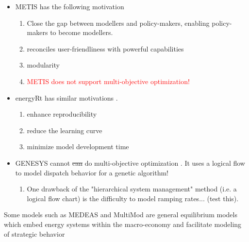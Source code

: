 \begin{itemize}
    \item METIS has the following motivation \cite{sakellaris_metis_2018}
    \begin{enumerate}
        \item Close the gap between modellers and policy-makers, enabling policy-makers to become modellers.
        \item reconciles user-friendliness with powerful capabilities
        \item modularity
        \item \textcolor{red}{METIS does not support multi-objective optimization!}    
    \end{enumerate}
    \item energyRt has similar motivations \cite{lugovoy_energyrt_2022}.
    \begin{enumerate}
        \item enhance reproducibility
        \item reduce the learning curve
        \item minimize model development time
    \end{enumerate}
    \item GENESYS cannot \sout{can} do multi-objective optimization \cite{bussar_optimal_2014}. It uses a logical flow to model dispatch behavior for a genetic algorithm!
    \begin{enumerate}
        \item One drawback of the "hierarchical system management" method (i.e. a logical flow chart) is the difficulty to model ramping rates... (test this).
    \end{enumerate}
\end{itemize}

Some models such as MEDEAS \cite{capellan-perez_medeas_2020} and MultiMod \cite{huppmann_market_2014} are general equilibrium models which embed energy
systems within the macro-economy and facilitate modeling of strategic behavior 